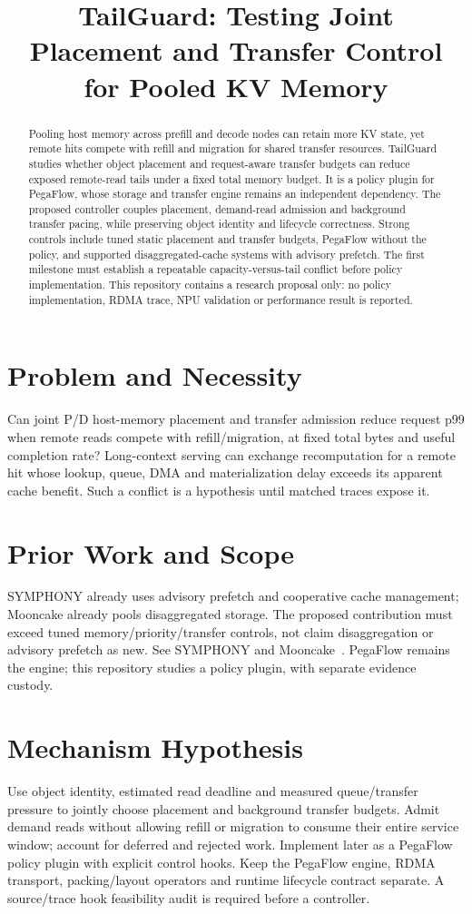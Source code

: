 \documentclass[conference]{IEEEtran}
\begin{document}
\title{TailGuard: Testing Joint Placement and Transfer Control for Pooled KV Memory}
\author{}
\maketitle
\begin{abstract}
Pooling host memory across prefill and decode nodes can retain more KV state, yet remote hits compete with refill and migration for shared transfer resources. TailGuard studies whether object placement and request-aware transfer budgets can reduce exposed remote-read tails under a fixed total memory budget. It is a policy plugin for PegaFlow, whose storage and transfer engine remains an independent dependency. The proposed controller couples placement, demand-read admission and background transfer pacing, while preserving object identity and lifecycle correctness. Strong controls include tuned static placement and transfer budgets, PegaFlow without the policy, and supported disaggregated-cache systems with advisory prefetch. The first milestone must establish a repeatable capacity-versus-tail conflict before policy implementation. This repository contains a research proposal only: no policy implementation, RDMA trace, NPU validation or performance result is reported.
\end{abstract}
\section{Problem and Necessity}
Can joint P/D host-memory placement and transfer admission reduce request p99 when remote reads compete with refill/migration, at fixed total bytes and useful completion rate? Long-context serving can exchange recomputation for a remote hit whose lookup, queue, DMA and materialization delay exceeds its apparent cache benefit. Such a conflict is a hypothesis until matched traces expose it.
\section{Prior Work and Scope}
SYMPHONY already uses advisory prefetch and cooperative cache management; Mooncake already pools disaggregated storage. The proposed contribution must exceed tuned memory/priority/transfer controls, not claim disaggregation or advisory prefetch as new. See SYMPHONY and Mooncake~\cite{agarwal2026symphony,qin2025mooncake}. PegaFlow remains the engine; this repository studies a policy plugin, with separate evidence custody.
\section{Mechanism Hypothesis}
Use object identity, estimated read deadline and measured queue/transfer pressure to jointly choose placement and background transfer budgets. Admit demand reads without allowing refill or migration to consume their entire service window; account for deferred and rejected work. Implement later as a PegaFlow policy plugin with explicit control hooks. Keep the PegaFlow engine, RDMA transport, packing/layout operators and runtime lifecycle contract separate. A source/trace hook feasibility audit is required before a controller.
\end{document}
